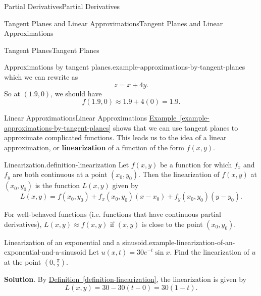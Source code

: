 \documentclass[10pt,]{book}
\newcommand{\terminology}[1]{\textbf{#1}}
\numberwithin{equation}{section}
\begin{document}
\begin{chapterptx}{Partial Derivatives}{}{Partial Derivatives}{}{}
\begin{sectionptx}{Tangent Planes and Linear Approximations}{}{Tangent Planes and Linear Approximations}{}{}
\begin{subsectionptx}{Tangent Planes}{}{Tangent Planes}{}{}
\begin{example}{Approximations by tangent planes.}{example-approximations-by-tangent-planes}
which we can rewrite as%
\begin{equation*}
z = x + 4y.
\end{equation*}
So at \((1.9,0)\), we should have%
\begin{equation*}
f(1.9,0)\approx 1.9 + 4(0) = 1.9.
\end{equation*}
%
\end{example}
\end{subsectionptx}
%
%
\typeout{************************************************}
\typeout{************************************************}
%
\begin{subsectionptx}{Linear Approximations}{}{Linear Approximations}{}{}\label{subsection-linear-approximations}
\hypertarget{p-1158}{}%
\hyperref[example-approximations-by-tangent-planes]{Example~\ref{example-approximations-by-tangent-planes}} shows that we can use tangent planes to approximate complicated functions. This leads us to the idea of a linear approximation, or \terminology{linearization} of a function of the form \(f(x,y)\).%
\begin{definition}{Linearization.}{definition-linearization}%
\hypertarget{p-1159}{}%
Let \(f(x,y)\) be a function for which \(f_{x}\) and \(f_{y}\) are both continuous at a point \((x_{0},y_{0})\). Then the linearization of \(f(x,y)\) at \((x_{0},y_{0})\) is the function \(L(x,y)\) given by%
\begin{equation*}
L(x,y) = f(x_{0},y_{0}) + f_{x}(x_{0},y_{0})(x-x_{0}) + f_{y}(x_{0},y_{0})(y-y_{0}).
\end{equation*}
%
\end{definition}
\hypertarget{p-1160}{}%
For well-behaved functions (i.e. functions that have continuous partial derivatives), \(L(x,y)\approx f(x,y)\) if \((x,y)\) is close to the point \((x_{0},y_{0})\).%
\begin{example}{Linearization of an exponential and a sinusoid.}{example-linearization-of-an-exponential-and-a-sinusoid}%
\hypertarget{p-1161}{}%
Let \(u(x,t) = 30e^{-t}\sin x\). Find the linearization of \(u\) at the point \((0,\frac{\pi}{2})\).%
\par\smallskip%
\noindent\textbf{Solution}.\hypertarget{solution-180}{}\quad%
\hypertarget{p-1162}{}%
By \hyperref[definition-linearization]{Definition~\ref{definition-linearization}}, the linearization is given by%
\begin{equation*}
L(x,y) = 30 - 30(t - 0) = 30(1 - t).
\end{equation*}

\end{example}
\end{subsectionptx}
\end{sectionptx}
\end{chapterptx}
\end{document}
